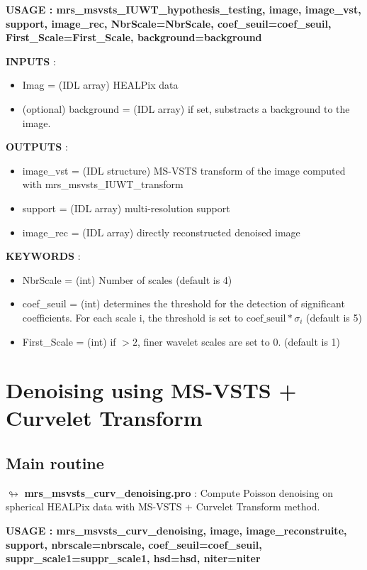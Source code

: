 \begin{center}
 \bf{USAGE : mrs\_msvsts\_IUWT\_hypothesis\_testing, image, image\_vst, support, image\_rec, NbrScale=NbrScale, coef\_seuil=coef\_seuil, First\_Scale=First\_Scale, background=background}
\end{center}

\textbf{INPUTS} :
\begin{itemize}
  \item Imag = (IDL array) HEALPix data
  \item (optional) background = (IDL array) if set, substracts a background to the image.
\end{itemize}

\textbf{OUTPUTS} : 
\begin{itemize}
  \item image\_vst = (IDL structure) MS-VSTS transform of the image computed with mrs\_msvsts\_IUWT\_transform
  \item support = (IDL array) multi-resolution support
  \item image\_rec = (IDL array) directly reconstructed denoised image
\end{itemize}

\textbf{KEYWORDS} :
\begin{itemize}
  \item NbrScale = (int) Number of scales (default is 4)
  \item coef\_seuil = (int) determines the threshold for the detection of significant coefficients. For each scale i, the threshold is set to $\text{coef\_seuil}*\sigma_i$ (default is 5)
  \item First\_Scale = (int) if $> 2$, finer wavelet scales are set to 0. (default is 1)
\end{itemize}


\section{Denoising using MS-VSTS + Curvelet Transform}

\subsection{Main routine}

$\looparrowright$ \textbf{mrs\_msvsts\_curv\_denoising.pro} :  Compute Poisson denoising on spherical HEALPix data with MS-VSTS + Curvelet Transform method.


\begin{center}
 \bf{USAGE : mrs\_msvsts\_curv\_denoising, image, image\_reconstruite, support, nbrscale=nbrscale, coef\_seuil=coef\_seuil, suppr\_scale1=suppr\_scale1, hsd=hsd, niter=niter}
\end{center}

